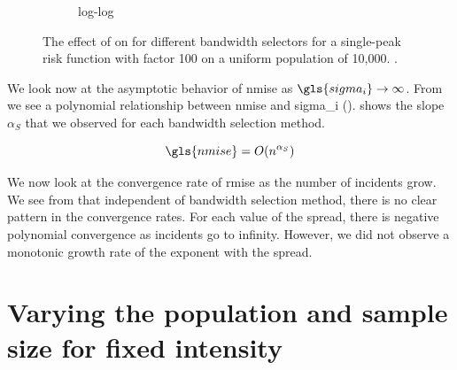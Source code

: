 \begin{figure}[htbp]
\begin{subfigure}[t]{0.49\textwidth}
        \caption{ log-log}
        \label{fig:ise:unif_Spreads_1h:nmise_log_log}
    \end{subfigure}
    \caption[: by risk ]
        {The effect of  on  for different bandwidth selectors for a single-peak risk function with \gls{factor} 100 on a uniform population of 10,000. \errorplotcaption.}
    \label{fig:ise:unif_Spreads_1h}
\end{figure}

We look now at the asymptotic behavior of \gls{nmise} as $\gls{sigma_i} \to \infty$.
From  we see a polynomial relationship between \gls{nmise} and \gls{sigma_i} ().
 shows the slope $\alpha_S$ that we observed for each bandwidth selection method.

\begin{equation}
    \label{eq:nmise:spread}
    \gls{nmise} = O(n^{\alpha_S})
\end{equation}


We now look at the convergence rate of \gls{rmise} as the number of incidents grow.
We see from  that independent of bandwidth selection method,
there is no clear pattern in the convergence rates.
For each value of the \gls{spread}, there is negative polynomial convergence as incidents go to infinity.
However, we did not observe a monotonic growth rate of the exponent with the spread.




\section{Varying the population and sample size for fixed intensity}
\label{sec:results:unifNpop_1h}

